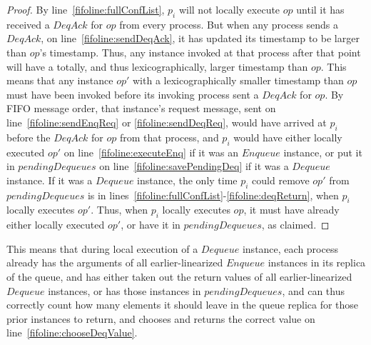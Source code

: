 \documentclass[a4paper,anonymous,USenglish]{lipics-v2021} %
\theoremstyle{definition}
\begin{document}
\begin{proof}
  By line~\ref{fifoline:fullConfList}, $p_i$ will not locally execute $op$ until it has received a $DeqAck$ for $op$ from every process.  But when any process sends a $DeqAck$, on line~\ref{fifoline:sendDeqAck}, it has updated its timestamp to be larger than $op$'s timestamp.  Thus, any instance invoked at that process after that point will have a totally, and thus lexicographically, larger timestamp than $op$.  This means that any instance $op'$ with a lexicographically smaller timestamp than $op$ must have been invoked before its invoking process sent a $DeqAck$ for $op$.  By FIFO message order, that instance's request message, sent on line~\ref{fifoline:sendEnqReq} or \ref{fifoline:sendDeqReq}, would have arrived at $p_i$ before the $DeqAck$ for $op$ from that process, and $p_i$ would have either locally executed $op'$ on line~\ref{fifoline:executeEnq} if it was an $Enqueue$ instance, or put it in $pendingDequeues$ on line~\ref{fifoline:savePendingDeq} if it was a $Dequeue$ instance.  If it was a $Dequeue$ instance, the only time $p_i$ could remove $op'$ from $pendingDequeues$ is in lines~\ref{fifoline:fullConfList}-\ref{fifoline:deqReturn}, when $p_i$ locally executes $op'$.  Thus, when $p_i$ locally executes $op$, it must have already either locally executed $op'$, or have it in $pendingDequeues$, as claimed.
\end{proof}

This means that during local execution of a $Dequeue$ instance, each process already has the arguments of all earlier-linearized $Enqueue$ instances in its replica of the queue, and has either taken out the return values of all earlier-linearized $Dequeue$ instances, or has those instances in $pendingDequeues$, and can thus correctly count how many elements it should leave in the queue replica for those prior instances to return, and chooses and returns the correct value on line~\ref{fifoline:chooseDeqValue}.



\end{document}

